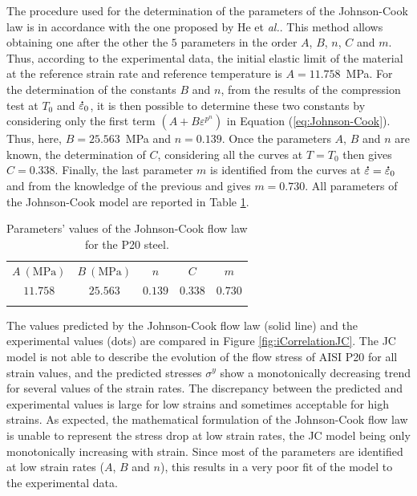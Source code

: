 \documentclass[twoside,english,1p,final,sort&compress]{elsarticle}
\makeatletter
\theoremstyle{plain}
\newcommand{\mdot}[1]{\accentset{\mbox{\bfseries .}}{#1}}
\newcommand*{\eal}{et \emph{al.}\@\xspace}
\makeatother
\begin{document}
The procedure used for the determination of the parameters of the Johnson-Cook law is in accordance with the one proposed by He \eal \cite{He-2013}.
This method allows obtaining one after the other the $5$ parameters in the order $A$, $B$, $n$, $C$ and $m$.
Thus, according to the experimental data, the initial elastic limit of the material at the reference strain rate and reference temperature is $A=11.758$~MPa.
For the determination of the constants $B$ and $n$, from the results of the compression test at $T_0$ and $\mdot\varepsilon_0$, it is then possible to determine these two constants by considering only the first term $\left(A+B\varepsilon^{p^{n}}\right)$ in Equation (\ref{eq:Johnson-Cook}).
Thus, here, $B=25.563$~MPa and $n=0.139$.
Once the parameters $A$, $B$ and $n$ are known, the determination of $C$, considering all the curves at $T=T_0$ then gives $C=0.338$.
Finally, the last parameter $m$ is identified from the curves at $\mdot\varepsilon=\mdot\varepsilon_0$ and from the knowledge of the previous and gives $m=0.730$.
All parameters of the Johnson-Cook model are reported in Table \ref{tab:JCparams}.

\begin{table}[h!]
\centering
\caption{Parameters' values of the Johnson-Cook flow law for the P20 steel.}
\begin{tabular}{ccccc}
\hline
$A~(\text{MPa})$ & $B~(\text{MPa})$ & $n$ & $C$ & $m$\\
$11.758$ & $25.563$ &  $0.139$ & $0.338$ & $0.730$\\ \hline
\label{tab:JCparams}
\end{tabular}
\end{table}

The values predicted by the Johnson-Cook flow law (solid line) and the experimental values (dots) are compared in Figure \ref{fig:iCorrelationJC}.
The JC model is not able to describe the evolution of the flow stress of AISI P20 for all strain values, and the predicted stresses $\sigma^y$ show a monotonically decreasing trend for several values of the strain rates.
The discrepancy between the predicted and experimental values is large for low strains and sometimes acceptable for high strains.
As expected, the mathematical formulation of the Johnson-Cook flow law is unable to represent the stress drop at low strain rates, the JC model being only monotonically increasing with strain.
Since most of the parameters are identified at low strain rates ($A$, $B$ and $n$), this results in a very poor fit of the model to the experimental data.
\end{document}
